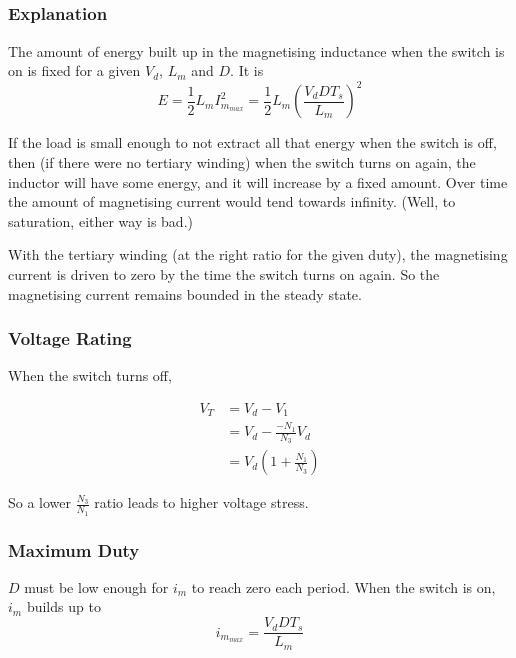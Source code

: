 \subsection{}


\begin{center}

\end{center}

\subsubsection*{Explanation}

The amount of energy built up in the magnetising inductance when the switch is on is fixed for a given $V_d$, $L_m$ and $D$.
It is
$$
E
= \frac{1}{2} L_m I_{m_{max}}^2
= \frac{1}{2} L_m \left(\frac{V_d DT_s}{L_m}\right)^2
$$

If the load is small enough to not extract all that energy when the switch is off, then (if there were no tertiary winding) when the switch turns on again, the inductor will have some energy, and it will increase by a fixed amount. Over time the amount of magnetising current would tend towards infinity. (Well, to saturation, either way is bad.)

With the tertiary winding (at the right ratio for the given duty), the magnetising current is driven to zero by the time the switch turns on again. So the magnetising current remains bounded in the steady state.

\subsubsection*{Voltage Rating}

When the switch turns off,

\begin{align*}
V_T & = V_d - V_1 \\
    & = V_d - \frac{-N_1}{N_3} V_d \\
    & = V_d \left(1+\frac{N_1}{N_3} \right)
\end{align*}

So a lower $\frac{N_3}{N_1}$ ratio leads to higher voltage stress.

\subsubsection*{Maximum Duty}

$D$ must be low enough for $i_m$ to reach zero each period.
When the switch is on, $i_m$ builds up to
$$
i_{m_{max}} = \frac{V_d D T_s}{L_m}
$$

